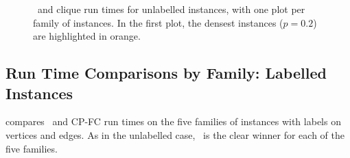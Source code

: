 \begin{figure}[htb]
{        \label{figure:mcsplain-runtime-mcsplitdown-clique-bv}
    }
    \caption{\McSplitDown\ and clique run times for unlabelled instances, with one plot per family of instances.  In the first plot,
            the densest instances ($p=0.2$) are highlighted in orange.}
    \label{figure:mcsplain-runtime-mcsplitdown-clique-scatters}
\end{figure}

\FloatBarrier

\subsection{Run Time Comparisons by Family: Labelled Instances}

 compares \McSplitDown\ and CP-FC run times
on the five families of instances with labels on vertices and edges.  As in the unlabelled case,
\McSplitDown\ is the clear winner for each of the five families.

